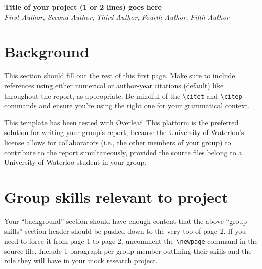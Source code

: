 \documentclass[11pt,letterpaper]{article}
\begin{document}
\begin{center}
    {\large \textbf{Title of your project (1 or 2 lines) goes here}} \\ \vspace{\baselineskip}%
    \textit{First Author}, \textit{Second Author}, \textit{Third Author}, \textit{Fourth Author}, \textit{Fifth Author}%
\end{center}


\section{Background}
This section should fill out the rest of this first page. Make sure to include references using either numerical or author-year citations (default) like \citet{weart2003} throughout the report, as appropriate. Be mindful of the \verb|\citet| and \verb|\citep| commands and ensure you're using the right one for your grammatical context. %

This template has been tested with Overleaf. This platform is the preferred solution for writing your group's report, because the University of Waterloo's license allows for collaborators (i.e., the other members of your group) to contribute to the report simultaneously, provided the source files belong to a University of Waterloo student in your group.


\section{Group skills relevant to project}
Your ``background'' section should have enough content that the above ``group skills'' section header should be pushed down to the very top of page 2. If you need to force it from page 1 to page 2, uncomment the \verb|\newpage| command in the source file. Include 1 paragraph per group member outlining their skills and the role they will have in your mock research project. %
\end{document}
